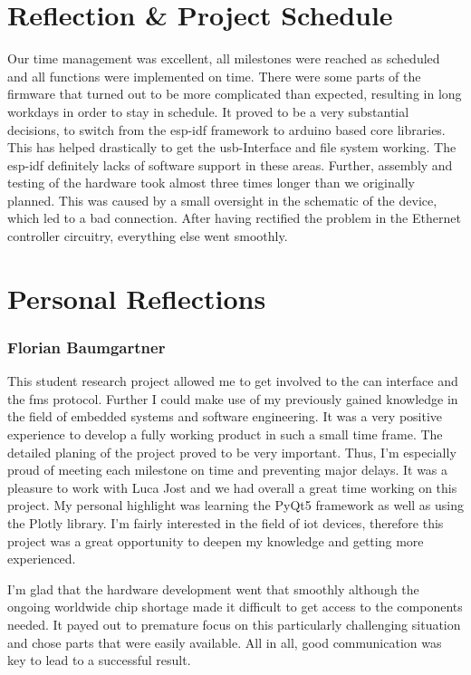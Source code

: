 \newpage
\section{Reflection \& Project Schedule}
Our time management was excellent, all milestones were reached as scheduled and all functions were implemented on time. There were some parts of the firmware that turned out to be more complicated than expected, resulting in long workdays in order to stay in schedule. It proved to be a very substantial decisions, to switch from the \gls{esp-idf} framework to \gls{arduino} based core libraries. This has helped drastically to get the \acrshort{usb}-Interface and file system working. The \gls{esp-idf} definitely lacks of software support in these areas. Further, assembly and testing of the hardware took almost three times longer than we originally planned. This was caused by a small oversight in the schematic of the device, which led to a bad connection. After having rectified the problem in the Ethernet controller circuitry, everything else went smoothly.

\section{Personal Reflections}

\subsubsection{Florian Baumgartner}
This student research project allowed me to get involved to the \acrshort{can} interface and the \acrshort{fms} protocol. Further I could make use of my previously gained knowledge in the field of embedded systems and software engineering. It was a very positive experience to develop a fully working product in such a small time frame. The detailed planing of the project proved to be very important. Thus, I'm especially proud of meeting each milestone on time and preventing major delays. \newline
It was a pleasure to work with Luca Jost and we had overall a great time working on this project. My personal highlight was learning the PyQt5 framework as well as using the Plotly library. I'm fairly interested in the field of \acrshort{iot} devices, therefore this project was a great opportunity to deepen my knowledge and getting more experienced.

I'm glad that the hardware development went that smoothly although the ongoing worldwide chip shortage made it difficult to get access to the components needed. It payed out to premature focus on this particularly challenging situation and chose parts that were easily available. All in all, good communication was key to lead to a successful result.

